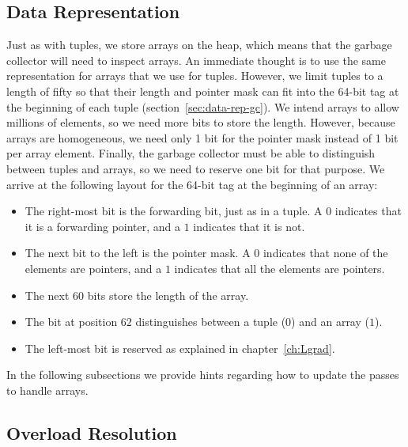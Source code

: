 \documentclass[7x10]{TimesAPriori_MIT}%
\numberwithin{theorem}{chapter}
\numberwithin{definition}{chapter}
\numberwithin{equation}{chapter}
\begin{document}
\subsection{Data Representation}
\label{sec:array-rep}

Just as with tuples, we store arrays on the heap, which means that the
garbage collector will need to inspect arrays. An immediate thought is
to use the same representation for arrays that we use for tuples.
However, we limit tuples to a length of fifty so that their length and
pointer mask can fit into the 64-bit tag at the beginning of each
tuple (section~\ref{sec:data-rep-gc}). We intend arrays to allow
millions of elements, so we need more bits to store the length.
However, because arrays are homogeneous, we need only 1 bit for the
pointer mask instead of 1 bit per array element.  Finally, the
garbage collector must be able to distinguish between tuples
and arrays, so we need to reserve one bit for that purpose.  We
arrive at the following layout for the 64-bit tag at the beginning of
an array:
\begin{itemize}
\item The right-most bit is the forwarding bit, just as in a tuple.
  A $0$ indicates that it is a forwarding pointer, and a $1$ indicates
  that it is not.
  
\item The next bit to the left is the pointer mask. A $0$ indicates
  that none of the elements are pointers, and a $1$ indicates that all
  the elements are pointers.

\item The next $60$ bits store the length of the array.

\item The bit at position $62$ distinguishes between a tuple ($0$)
  and an array ($1$).

\item The left-most bit is reserved as explained in
  chapter~\ref{ch:Lgrad}.
\end{itemize}



In the following subsections we provide hints regarding how to update
the passes to handle arrays.


\subsection{Overload Resolution}
\label{sec:array-resolution}
\end{document}
